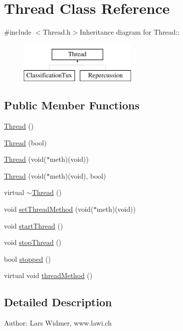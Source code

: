 \hypertarget{classThread}{
\section{Thread Class Reference}
\label{classThread}
}


{\ttfamily \#include $<$Thread.h$>$}Inheritance diagram for Thread::\begin{figure}[H]
\begin{center}
\leavevmode
\includegraphics[height=2cm]{classThread}
\end{center}
\end{figure}
\subsection*{Public Member Functions}
\begin{DoxyCompactItemize}
\item 
\hyperlink{classThread_a95c703fb8f2f27cb64f475a8c940864a}{Thread} ()
\item 
\hyperlink{classThread_ac0694151493165119c7ed053361c39da}{Thread} (bool)
\item 
\hyperlink{classThread_a32b9d6af7d10c905532fcfb3fa37b76e}{Thread} (void($\ast$meth)(void))
\item 
\hyperlink{classThread_ad0490fe492f3a40966fd7d4a7b23c802}{Thread} (void($\ast$meth)(void), bool)
\item 
virtual \hyperlink{classThread_a37d9edd3a1a776cbc27dedff949c9726}{$\sim$Thread} ()
\item 
void \hyperlink{classThread_ac504c0ff927a69c3a8e1a12f5a3addb8}{setThreadMethod} (void($\ast$meth)(void))
\item 
void \hyperlink{classThread_a5502205d727c00752f95af27a063d983}{startThread} ()
\item 
void \hyperlink{classThread_ac2bbc5e496966abd6d13d73f7e0810d6}{stopThread} ()
\item 
bool \hyperlink{classThread_ae088be9ac88ea8eaef813638c497f91b}{stopped} ()
\item 
virtual void \hyperlink{classThread_adc91220b96d25109b5f3ea73f8a75947}{threadMethod} ()
\end{DoxyCompactItemize}


\subsection{Detailed Description}
Author: Lars Widmer, www.lawi.ch 

